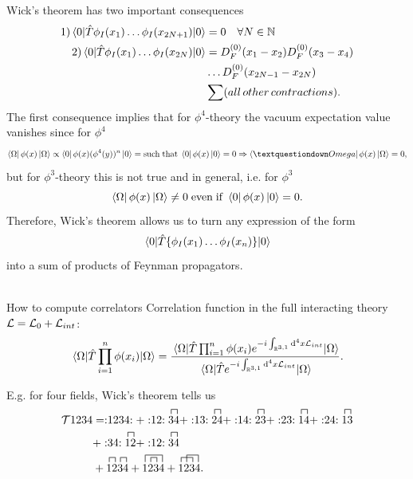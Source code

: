 Wick's theorem has two important consequences
\begin{align}
	\label{eq:wickodd}
	1) \expval{\hat{T} \phi_I(x_1) \dots \phi_I(x_{2N+1})}{0} &= 0 \quad \forall N\in \mathbb{N} \\
	2) \expval{\hat{T}\phi_I(x_1) \dots \phi_I(x_{2N})}{0} &=D^{(0)}_F(x_1-x_2) D^{(0)}_F(x_3-x_4) \\\nonumber
	&\dots D^{(0)}_F(x_{2N-1}-x_{2N}) \\ \nonumber
	& \sum (all \,other\, contractions).\nonumber
\end{align}
The first consequence implies that for $\phi^4$-theory the vacuum expectation value vanishes since for $\phi^4$
\begin{equation}
	\bra{\Omega}\phi(x)\ket{\Omega} \propto \bra{0}\phi(x) (\phi^4(y))^n\ket{0} = \mathrm{such\;that} \; \bra{0}\phi(x) \ket{0} = 0 \Rightarrow \bra{¿Omega}\phi(x) \ket{\Omega}=0,
\end{equation}
but for $\phi^3$-theory this is not true and in general, i.e. for $\phi^3$
\begin{equation}
	\bra{\Omega}\phi(x) \ket{\Omega}\neq 0\; \mathrm{even\;if}\; \bra{0}\phi(x)\ket{0}=0.
\end{equation}
Therefore, Wick's theorem allows us to turn any expression of the form  
\begin{equation}
	\expval{\hat{T}\{\phi_I(x_1) \dots \phi_I(x_n)\}}{0}
\end{equation}
into a sum of products of Feynman propagators.\\
\\
\begin{mybox}{How to compute correlators}
	Correlation function in the full interacting theory $\mathcal{L} = \mathcal{L}_0 + \mathcal{L}_{int}$:
	\begin{equation}
		\expval{\hat{T}\prod_{i=1}^{n} \phi(x_i)}{\Omega} = \frac{\expval{\hat{T} \prod_{i=1}^{n} \phi(x_i) e^{-i \int_{\mathbb{R}^{3,1}} \mathrm{d}^4 x \mathcal{L}_{int}}}{\Omega}}{\expval{\hat{T}e^{-i \int_{\mathbb{R}^{3,1}} \mathrm{d}^4 x \mathcal{L}_{int}}}{\Omega}}.
	\end{equation}
\end{mybox}
E.g. for four fields, Wick's theorem tells us
\begin{align*}
	\mathcal{T}1234 &= \normord{1234}+\normord{12} \contraction{}{3}{}{4} 34+ \normord{13}\contraction{}{2}{}{4}24 + \normord{14} \contraction{}{2}{}{3}23+\normord{23}\contraction{}{1}{}{4} 14+\normord{24}\contraction{}{1}{}{3}{}13\\
	&+\normord{34}\contraction{}{1}{}{2}12+\normord{12}\contraction{}{3}{}{4}34\\
	&+\contraction{}{1}{}{2}\contraction{12}{3}{}{4}1234 + \contraction[1.5ex]{}{1}{23}{4}\contraction{1}{2}{}{3}1234 +\contraction{}{1}{2}{3} \contraction[1.5ex]{1}{2}{3}{4}1234.
\end{align*}












